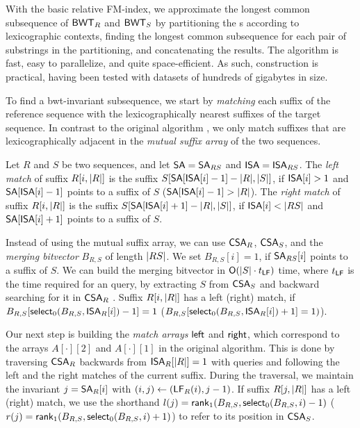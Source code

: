 With the basic relative FM-index, we approximate the longest common
subsequence of $\mathsf{BWT}_{R}$ and $\mathsf{BWT}_{S}$ by partitioning the \BWT{}s according
to lexicographic contexts, finding the longest common subsequence for each
pair of substrings in the partitioning, and concatenating the results. The
algorithm is fast, easy to parallelize, and quite space-efficient. As such,
\RFM{} construction is practical, having been tested with datasets of hundreds
of gigabytes in size.

To find a bwt-invariant subsequence, we start by \emph{matching} each suffix
of the reference sequence with the lexicographically nearest suffixes of the
target sequence. In contrast to the original algorithm \cite{Belazzougui2014}, we
only match suffixes that are lexicographically adjacent in the \emph{mutual
suffix array} of the two sequences.

\begin{definition}
Let $R$ and $S$ be two sequences, and let $\mathsf{SA} = \mathsf{SA}_{RS}$ and $\mathsf{ISA} =
\mathsf{ISA}_{RS}$. The \emph{left match} of suffix $R[i,\lvert R \rvert]$ is the suffix
$S[\mathsf{SA}[\mathsf{ISA}[i]-1] - \lvert R \rvert, \lvert S \rvert]$, if $\mathsf{ISA}[i] > 1$ and
$\mathsf{SA}[\mathsf{ISA}[i]-1]$ points to a suffix of $S$ ($\mathsf{SA}[\mathsf{ISA}[i]-1] > \lvert R \rvert$).
The \emph{right match} of suffix $R[i,\lvert R \rvert]$ is the suffix
$S[\mathsf{SA}[\mathsf{ISA}[i]+1] - \lvert R \rvert, \lvert S \rvert]$, if $\mathsf{ISA}[i] < \lvert RS \rvert$ and
$\mathsf{SA}[\mathsf{ISA}[i]+1]$ points to a suffix of $S$.
\end{definition}

Instead of using the mutual suffix array, we can use $\mathsf{CSA}_{R}$, $\mathsf{CSA}_{S}$,
and the \emph{merging bitvector} $B_{R,S}$ of length $\lvert RS \rvert$. We set
$B_{R,S}[i] = 1$, if $\mathsf{SA}_{RS}[i]$ points to a suffix of $S$. We can build the
merging bitvector in $\mathsf{O}(\lvert S \rvert \cdot t_{\mathsf{LF}})$ time, where $t_{\mathsf{LF}}$ is
the time required for an \LF{} query, by extracting $S$ from $\mathsf{CSA}_{S}$ and
backward searching for it in $\mathsf{CSA}_{R}$ \cite{Siren2009}. Suffix
$R[i,\lvert R \rvert]$ has a left (right) match, if $B_{R,S}[\mathsf{select}_{0}(B_{R,S},
\mathsf{ISA}_{R}[i])-1] = 1$ ($B_{R,S}[\mathsf{select}_{0}(B_{R,S}, \mathsf{ISA}_{R}[i])+1] = 1)$).

Our next step is building the \emph{match arrays} $\mathsf{left}$ and $\mathsf{right}$,
which correspond to the arrays $A[\cdot][2]$ and $A[\cdot][1]$ in the original
algorithm. This is done by traversing $\mathsf{CSA}_{R}$ backwards from
$\mathsf{ISA}_{R}[\lvert R \rvert] = 1$ with \LF{} queries and following the left and the
right matches of the current suffix. During the traversal, we maintain
the invariant $j = \mathsf{SA}_{R}[i]$ with $(i,j) \leftarrow (\mathsf{LF}_{R}(i), j-1)$. If
suffix $R[j,\lvert R \rvert]$ has a left (right) match, we use the shorthand $l(j) =
\mathsf{rank}_{1}(B_{R,S}, \mathsf{select}_{0}(B_{R,S}, i)-1)$ ($r(j) = \mathsf{rank}_{1}(B_{R,S},
\mathsf{select}_{0}(B_{R,S}, i)+1)$) to refer to its position in $\mathsf{CSA}_{S}$.

